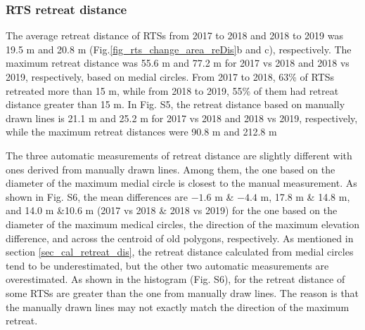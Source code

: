 \documentclass[authoryear,preprint,review,12pt]{elsarticle}
\begin{document}


\subsubsection{RTS retreat distance}
\label{sec_rts_retreat_distance}

The average retreat distance of RTSs from 2017 to 2018 and 2018 to 2019 was 19.5 m and 20.8 m (Fig.\ref{fig_rts_change_area_reDis}b and c), respectively. 
The maximum retreat distance was 55.6 m and 77.2 m for 2017 vs 2018 and 2018 vs 2019, respectively, based on medial circles. 
From 2017 to 2018, 63\% of RTSs retreated more than 15 m, while from 2018 to 2019, 55\% of them had retreat distance greater than 15 m. 
In Fig. S5, the retreat distance based on manually drawn lines is 21.1 m and 25.2 m for 2017 vs 2018 and 2018 vs 2019, respectively, while the maximum retreat distances were 90.8 m and 212.8 m

The three automatic measurements of retreat distance are slightly different with ones derived from manually drawn lines. Among them, the one based on the diameter of the maximum medial circle is closest to the manual measurement. 
As shown in Fig. S6, the mean differences are $-1.6$ m \& $-4.4$ m, 17.8 m \& 14.8 m, and 14.0 m \&10.6 m (2017 vs 2018 \& 2018 vs 2019) for the one based on the diameter of the maximum medical circles, the direction of the maximum elevation difference, and across the centroid of old polygons, respectively. 
As mentioned in section \ref{sec_cal_retreat_dis}, the retreat distance calculated from medial circles tend to be underestimated, but the other two automatic measurements are overestimated. 
As shown in the histogram (Fig. S6), for the retreat distance of some RTSs are greater than the one from manually draw lines. 
The reason is that the manually drawn lines may not exactly match the direction of the maximum retreat.  
\end{document}
